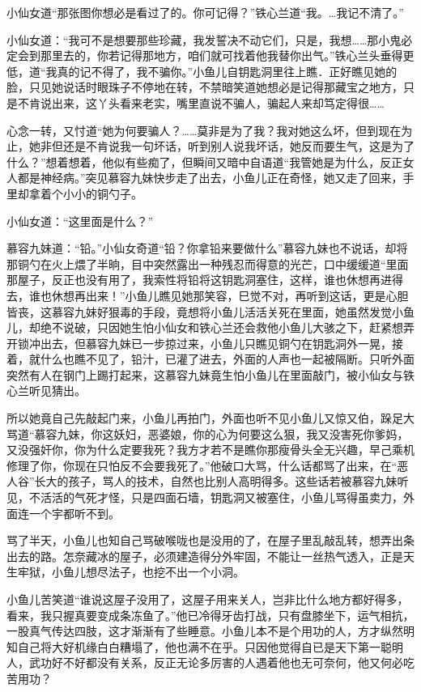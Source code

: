 \documentclass[12pt,oneside]{book}
\begin{document}
小仙女道``那张图你想必是看过了的。你可记得？''铁心兰道``我。\ldots 我记不清了。''

小仙女道：``我可不是想要那些珍藏，我发誓决不动它们，只是，我想\ldots\ldots 那小鬼必定会到那里去的，你若记得那地方，咱们就可找着他我替你出气。''铁心兰头垂得更低，道``我真的记不得了，我不骗你。''小鱼儿自钥匙洞里往上瞧．正好瞧见她的脸，只见她说话时眼珠子不停地在转，不禁暗笑道她想必是记得那藏宝之地方，只是不肯说出来，这丫头看来老实，嘴里直说不骗人，骗起人来却笃定得很\ldots\ldots{}

心念一转，又忖道``她为何要骗人？\ldots\ldots 莫非是为了我？我对她这么坏，但到现在为止，她非但还是不肯说我一句坏话，听到别人说我坏话，她反而要生气，这是为了什么？''想着想着，他似有些痴了，但瞬间又暗中自语道``我管她是为什么，反正女人都是神经病。''突见慕容九妹快步走了出去，小鱼儿正在奇怪，她又走了回来，手里却拿着个小小的铜勺子。

小仙女道：``这里面是什么？''

慕容九妹道：``铅。''小仙女奇道``铅？你拿铅来要做什么''慕容九妹也不说话，却将那铜勺在火上煨了半晌，目中突然露出一种残忍而得意的光芒，口中缓缓道``里面那屋子，反正也没有用了，我索性将铅将这钥匙洞塞住，这样，谁也休想再进得去，谁也休想再出来！''小鱼儿瞧见她那笑容，巳觉不对，再听到这话，更是心胆皆丧，这慕容九妹好狠毒的手段，竟想将小鱼儿活活关死在里面，她虽然发觉小鱼儿，却绝不说破，只因她生怕小仙女和铁心兰还会救他小鱼儿大骇之下，赶紧想弄开锁冲出去，但慕容九妹已一步掠过来，小鱼儿只瞧见铜勺在钥匙洞外一晃，接着，就什么也瞧不见了，铅汁，已灌了进去，外面的人声也一起被隔断。只听外面突然有人在钢门上踢打起来，这慕容九妹竟生怕小鱼儿在里面敲门，被小仙女与铁心兰听见猜出。

所以她竟自己先敲起门来，小鱼儿再拍门，外面也听不见小鱼儿又惊又伯，跺足大骂道``慕容九妹，你这妖妇，恶婆娘，你的心为何要这么狠，我又没害死你爹妈，又没强奸你，你为什么定要我死？我方才若不是瞧你那瘦骨头全无兴趣，早己乘机修理了你，你现在只怕反不会要我死了。''他破口大骂，什么话都骂了出来，在``恶人谷''长大的孩子，骂人的技术，自然也比别人高明得多。这些话若被慕容九妹听见，不活活的气死才怪，只是四面石墙，钥匙洞又被塞住，小鱼儿骂得虽卖力，外面连一个宇都听不到。

骂了半天，小鱼儿也知自己骂破喉咙也是没用的了，在屋子里乱敲乱转，想弄出条出去的路。怎奈藏冰的屋子，必须建造得分外牢固，不能让一丝热气透入，正是天生牢狱，小鱼儿想尽法子，也挖不出一个小洞。

小鱼儿苦笑道``谁说这屋子没用了，这屋子用来关人，岂非比什么地方都好得多，看来，我只握真要变成条冻鱼了。''他已冷得牙齿打战，只有盘膝坐下，运气相抗，一股真气传达四肢，这才渐渐有了些睡意。小鱼儿本不是个用功的人，方才纵然明知自己将大好机缘白白糟塌了，他也满不在乎。只因他觉得自已是天下第一聪明人，武功好不好都没有关系，反正无论多厉害的人遇着他也无可奈何，他又何必吃苦用功？
\end{document}
